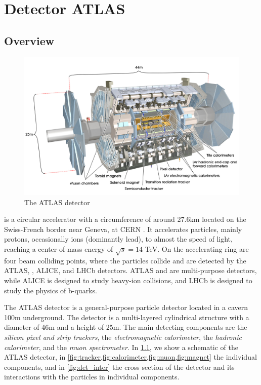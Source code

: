 \chapter{Detector ATLAS}
\label{ch:atlas}

\section{Overview}
\begin{figure}[htb]
    \centering
    \includegraphics[width=1\linewidth]{src/img/atlas.jpg}
    \caption{The ATLAS detector}
    \label{fig:atlas}
\end{figure}

\LHC is a circular accelerator with a circumference of around 27.6km located on the Swiss-French border near Geneva, at CERN \cite{cern}.
It accelerates particles, mainly protons, occasionally ions (dominantly lead), to almost the speed of light, reaching a center-of-mass energy of $\sqrt{s} = 14$ TeV.
On the accelerating ring are four beam colliding points, where the particles collide and are detected by the ATLAS, \CMS, ALICE, and LHCb detectors.
ATLAS and \CMS are multi-purpose detectors, while ALICE is designed to study heavy-ion collisions, and LHCb is designed to study the physics of b-quarks.


The ATLAS detector \cite{ATLAS} is a general-purpose particle detector located in a cavern 100m underground.
The detector is a multi-layered cylindrical structure with a diameter of 46m and a height of 25m.
The main detecting components are the \emph{silicon pixel and strip trackers}, the \emph{electromagnetic \LAr calorimeter}, the \emph{hadronic calorimeter}, and the \emph{muon spectrometer}.
In \cref{fig:atlas}, we show a schematic of the ATLAS detector, in \cref{fig:tracker,fig:calorimeter,fig:muon,fig:magnet} the individual components, and in \cref{fig:det_inter} the cross section of the detector and its interactions with the particles in individual components.

